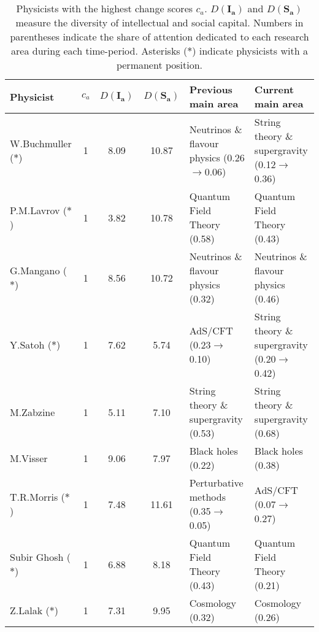 \begin{table}[H]
\centering
\caption{Physicists with the highest change scores $c_a$. $D(\bm{I_a})$ and $D(\bm{S_a})$ measure the diversity of intellectual and social capital. Numbers in parentheses indicate the share of attention dedicated to each research area during each time-period. Asterisks ($\ast$) indicate physicists with a permanent position.}
\label{table:top_exited}
\begin{tabular}{p{}|c|c|c|b{}|b{}}
\toprule
             Physicist & $c_a$ & $D(\bm{I_a})$ & $D(\bm{S_a})$ &                            Previous main area &                                Current main area \\
\midrule
 W.Buchmuller ($\ast$) &     1 &          8.09 &         10.87 &  Neutrinos \& flavour physics (0.26$\to$0.06) & String theory \& supergravity (0.12$\to$0.36)\\ \hline
   P.M.Lavrov ($\ast$) &     1 &          3.82 &         10.78 &                   Quantum Field Theory (0.58) &                   Quantum Field Theory (0.43)\\ \hline
    G.Mangano ($\ast$) &     1 &          8.56 &         10.72 &           Neutrinos \& flavour physics (0.32) &           Neutrinos \& flavour physics (0.46)\\ \hline
      Y.Satoh ($\ast$) &     1 &          7.62 &          5.74 &                       AdS/CFT (0.23$\to$0.10) & String theory \& supergravity (0.20$\to$0.42)\\ \hline
             M.Zabzine &     1 &          5.11 &          7.10 &          String theory \& supergravity (0.53) &          String theory \& supergravity (0.68)\\ \hline
              M.Visser &     1 &          9.06 &          7.97 &                            Black holes (0.22) &                            Black holes (0.38)\\ \hline
   T.R.Morris ($\ast$) &     1 &          7.48 &         11.61 &          Perturbative methods (0.35$\to$0.05) &                       AdS/CFT (0.07$\to$0.27)\\ \hline
  Subir Ghosh ($\ast$) &     1 &          6.88 &          8.18 &                   Quantum Field Theory (0.43) &                   Quantum Field Theory (0.21)\\ \hline
      Z.Lalak ($\ast$) &     1 &          7.31 &          9.95 &                              Cosmology (0.32) &                              Cosmology (0.26)\\ \hline

\end{tabular}
\end{table}
